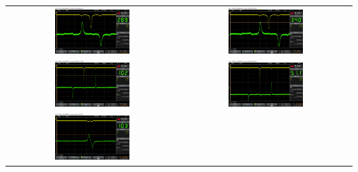 \begin{center}
    \captionsetup{type=figure}
    \begin{tabular}{c c}
        \includegraphics[width=0.45\textwidth]{Bilder/Jodlinie/scope_6.png} 
        & \includegraphics[width=0.45\textwidth]{Bilder/Jodlinie/scope_7.png} \\
        \includegraphics[width=0.45\textwidth]{Bilder/Jodlinie/scope_4.png}
        & \includegraphics[width=0.45\textwidth]{Bilder/Jodlinie/scope_5.png} \\
        \includegraphics[width=0.45\textwidth]{Bilder/Jodlinie/scope_8.png}

\end{tabular}
\end{center}
